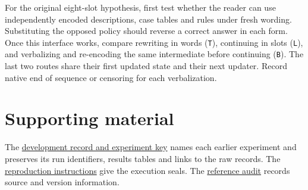 \documentclass[11pt]{article}
\begin{document}
For the original eight-slot hypothesis, first test whether the reader can use independently encoded descriptions, case tables and rules under fresh wording. Substituting the opposed policy should reverse a correct answer in each form. Once this interface works, compare rewriting in words (\texttt{T}), continuing in slots (\texttt{L}), and verbalizing and re-encoding the same intermediate before continuing (\texttt{B}). The last two routes share their first updated state and their next updater. Record native end of sequence or censoring for each verbalization.

\section*{Supporting material}

The \href{https://github.com/RyoSpiralArchitect/self-fold/blob/v1.0.0/paper/DEVELOPMENT_RECORD.md}{development record and experiment key} names each earlier experiment and preserves its run identifiers, results tables and links to the raw records. The \href{https://github.com/RyoSpiralArchitect/self-fold/blob/v1.0.0/docs/REPRODUCING.md}{reproduction instructions} give the execution seals. The \href{https://github.com/RyoSpiralArchitect/self-fold/blob/v1.0.0/paper/REFERENCE_AUDIT.md}{reference audit} records source and version information.

\begingroup
\small
\setlength{\bibsep}{2pt plus 1pt}


\endgroup
\end{document}
